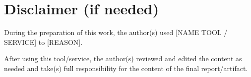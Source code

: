 \section*{Disclaimer (if needed)}

During the preparation of this work, the author(s) used [NAME TOOL / SERVICE] to [REASON].

After using this tool/service, 
the author(s) reviewed and edited the content as needed 
and take(s) full responsibility for the content of the final report/artifact.
